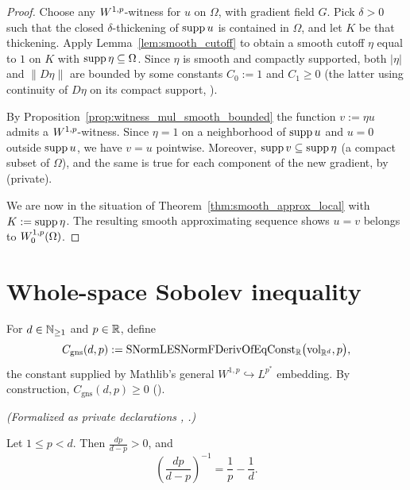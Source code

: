 \begin{proof}
\leanok
{}

Choose any $W^{1,p}$-witness for $u$ on $\Omega$, with gradient field $G$.
Pick $\delta > 0$ such that the closed $\delta$-thickening of $\operatorname{supp} u$ is
contained in $\Omega$, and let $K$ be that thickening. Apply
Lemma~\ref{lem:smooth_cutoff} to obtain a smooth cutoff $\eta$ equal to $1$ on
$K$ with $\operatorname{supp} \eta \subseteq \Omega$. Since $\eta$ is smooth and compactly
supported, both $|\eta|$ and $\|D\eta\|$ are bounded by some constants $C_0 :=
1$ and $C_1 \ge 0$ (the latter using continuity of $D\eta$ on its compact
support, ).

By Proposition~\ref{prop:witness_mul_smooth_bounded} the function $v := \eta u$
admits a $W^{1,p}$-witness. Since $\eta = 1$ on a neighborhood of $\operatorname{supp} u$
and $u = 0$ outside $\operatorname{supp} u$, we have $v = u$ pointwise. Moreover,
$\operatorname{supp} v \subseteq \operatorname{supp} \eta$ (a compact subset of $\Omega$), and the same is
true for each component of the new gradient, by
(private).

We are now in the situation of Theorem~\ref{thm:smooth_approx_local} with $K :=
\operatorname{supp}\eta$. The resulting smooth approximating sequence shows $u = v$ belongs
to $W_0^{1,p}(\Omega)$.
\end{proof}

\section{Whole-space Sobolev inequality}

\begin{definition}
\label{def:C_gns}
\leanok
For $d \in \mathbb{N}_{\ge 1}$ and $p \in \mathbb{R}$, define
\begin{equation*}
  C_{\mathrm{gns}}(d, p) :=
  \mathrm{SNormLESNormFDerivOfEqConst_{\mathbb{R}}}\bigl(\mathrm{vol}_{\mathbb{R}^d}, p\bigr),
\end{equation*}
the constant supplied by Mathlib's general $W^{1,p} \hookrightarrow L^{p^*}$
embedding. By construction, $C_{\mathrm{gns}}(d,p) \ge 0$
().
\end{definition}

\begin{lemma}
\label{lem:sobolev_exp}
\leanok
\noindent\textit{(Formalized as private declarations , .)}\par
Let $1 \le p < d$. Then $\frac{dp}{d - p} > 0$, and
\begin{equation*}
  \left(\frac{dp}{d - p}\right)^{-1} = \frac{1}{p} - \frac{1}{d}.
\end{equation*}
\end{lemma}

